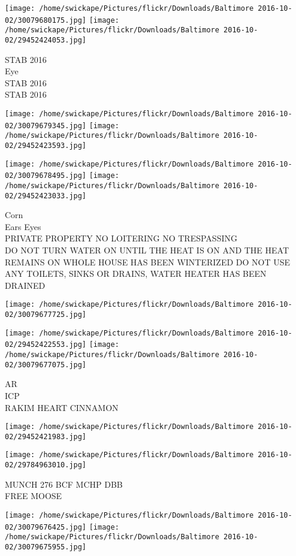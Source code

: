 \documentclass[10pt,letterpaper]{article}
\begin{document}
\texttt{[image: /home/swickape/Pictures/flickr/Downloads/Baltimore 2016-10-02/30079680175.jpg]}
\texttt{[image: /home/swickape/Pictures/flickr/Downloads/Baltimore 2016-10-02/29452424053.jpg]}

STAB 2016\\
Eye\\
STAB 2016\\
STAB 2016
\pagebreak

\texttt{[image: /home/swickape/Pictures/flickr/Downloads/Baltimore 2016-10-02/30079679345.jpg]}
\texttt{[image: /home/swickape/Pictures/flickr/Downloads/Baltimore 2016-10-02/29452423593.jpg]}

\texttt{[image: /home/swickape/Pictures/flickr/Downloads/Baltimore 2016-10-02/30079678495.jpg]}
\texttt{[image: /home/swickape/Pictures/flickr/Downloads/Baltimore 2016-10-02/29452423033.jpg]}

Corn\\
Ears Eyes\\
PRIVATE PROPERTY NO LOITERING NO TRESPASSING\\
DO NOT TURN WATER ON UNTIL THE HEAT IS ON AND THE HEAT REMAINS ON WHOLE HOUSE HAS BEEN WINTERIZED DO NOT USE ANY TOILETS, SINKS OR DRAINS, WATER HEATER HAS BEEN DRAINED
\pagebreak

\texttt{[image: /home/swickape/Pictures/flickr/Downloads/Baltimore 2016-10-02/30079677725.jpg]}

\vspace{0.25in}
\texttt{[image: /home/swickape/Pictures/flickr/Downloads/Baltimore 2016-10-02/29452422553.jpg]}
\texttt{[image: /home/swickape/Pictures/flickr/Downloads/Baltimore 2016-10-02/30079677075.jpg]}

AR\\
ICP\\
RAKIM HEART CINNAMON
\pagebreak

\texttt{[image: /home/swickape/Pictures/flickr/Downloads/Baltimore 2016-10-02/29452421983.jpg]}

\vspace{0.25in}
\texttt{[image: /home/swickape/Pictures/flickr/Downloads/Baltimore 2016-10-02/29784963010.jpg]}

MUNCH 276 BCF MCHP DBB\\
FREE MOOSE
\pagebreak

\texttt{[image: /home/swickape/Pictures/flickr/Downloads/Baltimore 2016-10-02/30079676425.jpg]}
\texttt{[image: /home/swickape/Pictures/flickr/Downloads/Baltimore 2016-10-02/30079675955.jpg]}
\end{document}

